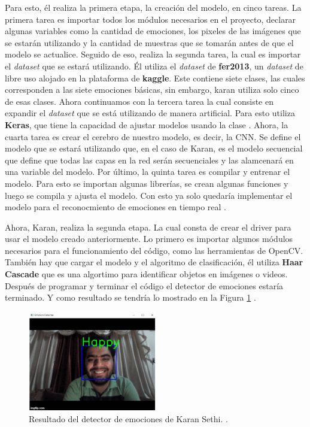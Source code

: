 Para esto, él realiza la primera etapa, la creación del modelo, en cinco tareas. La primera tarea es importar todos los módulos necesarios en el proyecto, declarar algunas variables como la cantidad de emociones, los pixeles de las imágenes que se estarán utilizando y la cantidad de muestras que se tomarán antes de que el modelo se actualice. Seguido de eso, realiza la segunda tarea, la cual es importar el \textit{dataset} que se estará utilizando. Él utiliza el \textit{dataset} de \textbf{fer2013}, un \textit{dataset} de libre uso alojado en la plataforma de \textbf{kaggle}. Este contiene siete clases, las cuales corresponden a las siete emociones básicas, sin embargo, karan utiliza solo cinco de esas clases. Ahora continuamos con la tercera tarea la cual consiste en expandir el \textit{dataset} que se está utilizando de manera artificial. Para esto utiliza \textbf{Keras}, que tiene la capacidad de ajustar modelos usando la clase . Ahora, la cuarta tarea es crear el cerebro de nuestro modelo, es decir, la CNN. Se define el modelo que se estará utilizando que, en el caso de Karan, es el modelo secuencial que define que todas las capas en la red serán secuenciales y las alamcenará en una variable del modelo. Por último, la quinta tarea es compilar y entrenar el modelo. Para esto se importan algunas librerías, se crean algunas funciones y luego se compila y ajusta el modelo. Con esto ya solo quedaría implementar el modelo para el reconocmiento de emociones en tiempo real \cite{Karan}.

Ahora, Karan, realiza la segunda etapa. La cual consta de crear el driver para usar el modelo creado anteriormente. Lo primero es importar algunos módulos necesarios para el funcionamiento del código, como las herramientas de OpenCV. También hay que cargar el modelo y el algoritmo de clasificación, él utiliza \textbf{Haar Cascade} que es una algortimo para identificar objetos en imágenes o videos. Después de programar y terminar el código el detector de emociones estaría terminado. Y como resultado se tendría lo mostrado en la Figura \ref{fig:KaranResult} \cite{Karan}.

\begin{figure}[h]
    \centering
    \includegraphics[width=0.5\textwidth]{figuras/Karan_Result.png}
    \caption{Resultado del detector de emociones de Karan Sethi. \cite{Karan}.}
    \label{fig:KaranResult}
\end{figure}